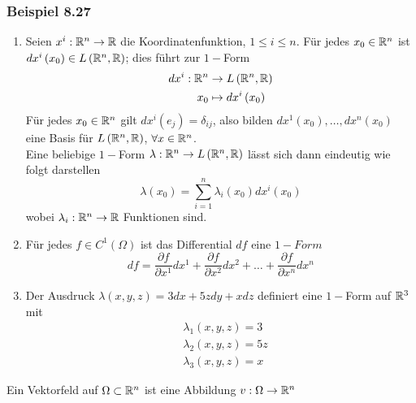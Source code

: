 \subsubsection*{Beispiel 8.27}
\begin{enumerate}
\item Seien $x^i:\mathbb{R}^n\to\mathbb{R}$ die Koordinatenfunktion, $1\leq i\leq n$. Für jedes $x_0\in\mathbb{R}^n$ ist $dx^i\left(x_0\right)\in L\left( \mathbb{R}^n,\mathbb{R}\right)$; dies führt zur $1-$Form
\begin{align*}
dx^i:\mathbb{R}^n&\to L\left( \mathbb{R}^n,\mathbb{R}\right)\\
x_0 &\mapsto dx^i\left( x_0\right)
\end{align*}
Für jedes $x_0\in\mathbb{R}^n$ gilt $dx^i\left(e_j\right)=\delta_{ij}$, also bilden $dx^1\left( x_0\right),\dots,dx^n\left( x_0\right)$ eine Basis für $L\left(\mathbb{R}^n,\mathbb{R}\right)$, $\forall x\in\mathbb{R}^n$.\\

Eine beliebige $1-$Form $\lambda :\mathbb{R}^n\to L\left(\mathbb{R}^n,\mathbb{R}\right)$ lässt sich dann eindeutig wie folgt darstellen \[\lambda \left( {{x_0}} \right) = \sum\limits_{i = 1}^n {{\lambda _i}\left( {{x_0}} \right)d{x^i}\left( {{x_0}} \right)} \] wobei $\lambda_i:\mathbb{R}^n\to\mathbb{R}$ Funktionen sind.
\item Für jedes $f\in C^1\left(\Omega\right)$ ist das Differential $df$ eine $1-Form$ \[df = \frac{{\partial f}}{{\partial {x^1}}}d{x^1} + \frac{{\partial f}}{{\partial {x^2}}}d{x^2} +  \ldots  + \frac{{\partial f}}{{\partial {x^n}}}d{x^n}\]
\item Der Ausdruck $\lambda\left(x,y,z\right)=3dx+5zdy+xdz$ definiert eine $1-$Form auf $\mathbb{R}^3$ mit
\begin{align*}
& \lambda_1\left(x,y,z\right)=3\\
& \lambda_2\left(x,y,z\right)=5z\\
& \lambda_3\left(x,y,z\right)=x
\end{align*}
\end{enumerate}
\begin{definition}{8.28}
Ein Vektorfeld auf $\Omega\subset\mathbb{R}^n$ ist eine Abbildung $v:\Omega\to\mathbb{R}^n$
\end{definition}

